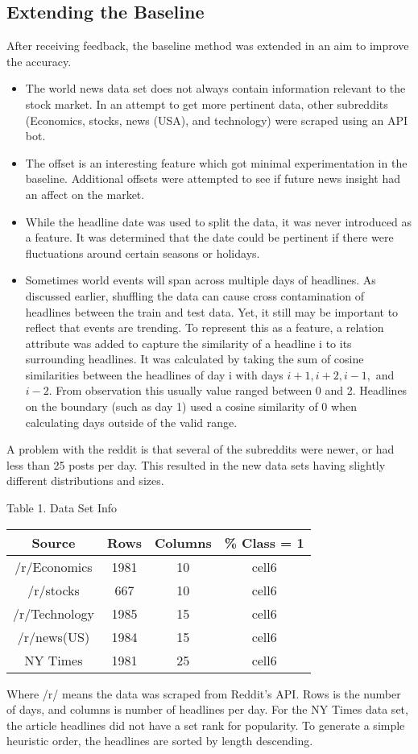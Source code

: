 \documentclass[11pt,a4paper]{article}
\begin{document}
\subsection{Extending the Baseline}
After receiving feedback, the baseline method was extended in an aim to improve the accuracy.
\begin{itemize}
\item The world news data set does not always contain information relevant to the stock market. In an attempt to get more pertinent data, other subreddits (Economics, stocks, news (USA), and technology) were scraped using an API bot.

\item The offset is an interesting feature which got minimal experimentation in the baseline. Additional offsets were attempted to see if future news insight had an affect on the market.

\item While the headline date was used to split the data, it was never introduced as a feature. It was determined that the date could be pertinent if there were fluctuations around certain seasons or holidays.

\item Sometimes world events will span across multiple days of headlines. As discussed earlier, shuffling the data can cause cross contamination of headlines between the train and test data. Yet, it still may be important to reflect that events are trending. To represent this as a feature, a relation attribute was added to capture the similarity of a headline i to its surrounding headlines. It was calculated by taking the sum of cosine similarities between the headlines of day i with days $i+1,i+2,i-1,$ and $i-2$. From observation this usually value ranged between 0 and 2. Headlines on the boundary (such as day 1) used a cosine similarity of 0 when calculating days outside of the valid range.
\end{itemize}

A problem with the reddit is that several of the subreddits were newer, or had less than 25 posts per day. This resulted in the new data sets having slightly different distributions and sizes.
\begin{center}
Table 1. Data Set Info
\begin{tabular}{ |c|c|c|c| } 
 \hline
 Source & Rows & Columns & \% Class = 1 \\
 \hline
 /r/Economics & 1981 & 10 & cell6 \\
 /r/stocks & 667 & 10 & cell6 \\ 
 /r/Technology & 1985 & 15 & cell6 \\
 /r/news(US) & 1984 & 15 & cell6 \\ 
 NY Times & 1981 & 25 & cell6 \\   
 \hline
\end{tabular}
\end{center}
Where /r/ means the data was scraped from Reddit's API. Rows is the number of days, and columns is number of headlines per day.
For the NY Times data set, the article headlines did not have a set rank for popularity. To generate a simple heuristic order, the headlines are sorted by length descending.\\
\end{document}
